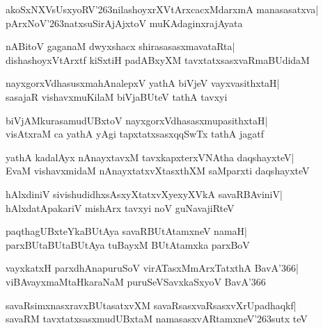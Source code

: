 \documentclass[twoside,12pt,openright]{book}
\def\S{\char'263}
\newcounter{shloka}[chapter]
\begin{document}
\begin{shloka}%
akoSxNXVsUsxyoRV\S nilashoyxrXVtArxcacxMdarxmA manasasatxva|\\
pArxNoV\S natxsuSirAjAjxtoV muKAdaginxrajAyata
\end{shloka}

\begin{shloka}%
nABitoV gaganaM dwyxshacx shirasasasxmavataRta|\\
dishashoyxVtArxtf kiSxtiH padABxyXM tavxtatxsasxvaRmaBUdidaM
\end{shloka}

\begin{shloka}%
nayxgorxVdhasusxmahAnalepxV yathA biVjeV vayxvasithxtaH|\\
sasajaR vishavxmuKilaM biVjaBUteV tathA tavxyi
\end{shloka}

\begin{shloka}%
biVjAMkurasamudUBxtoV nayxgorxVdhasasxmupasithxtaH|\\
visAtxraM ca yathA yAgi tapxtatxsasxqqSwTx tathA jagatf
\end{shloka}

\begin{shloka}%
yathA kadalAyx nAnayxtavxM tavxkapxterxVNAtha daqshayxteV|\\
EvaM vishavxmidaM nAnayxtatxvXtasxthXM saMparxti daqshayxteV
\end{shloka}

\begin{shloka}%
hAlxdiniV sivishudidhxsAsxyXtatxvXyexyXVkA savaRBAviniV|\\
hAlxdatApakariV mishArx tavxyi noV guNavajiRteV
\end{shloka}

\begin{shloka}%
paqthagUBxteYkaBUtAya savaRBUtAtamxneV namaH|\\
parxBUtaBUtaBUtAya tuBayxM BUtAtamxka parxBoV
\end{shloka}

\begin{shloka}%
vayxkatxH parxdhAnapuruSoV virATasxMmArxTatxthA BavA\char'366|\\
viBAvayxmaMtaHkaraNaM puruSeVSavxkaSxyoV BavA\char'366
\end{shloka}

\begin{shloka}%
savaRsimxnasxravxBUtasatxvXM savaRsasxvaRsasxvXrUpadhaqkf|\\
savaRM tavxtatxsasxmudUBxtaM namasasxvARtamxneV\S sutx teV
\end{shloka}
\end{document}
